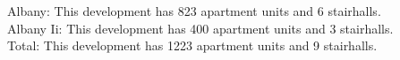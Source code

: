 {Albany}: This development has 823 apartment units and 6 stairhalls.\\{Albany Ii}: This development has 400 apartment units and 3 stairhalls.\\{Total}: This development has 1223 apartment units and 9 stairhalls.\\